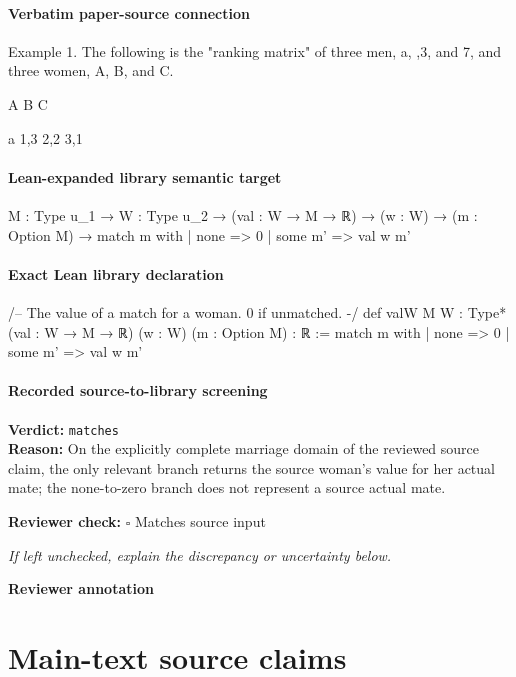 \documentclass[10pt]{article}
\newcommand{\reviewerbox}{%
  \par\noindent\fbox{\parbox{0.96\linewidth}{\rule{0pt}{0.38in}}}\par
}
\newcommand{\reviewmatch}[1]{%
  \par\noindent\textbf{Reviewer check:} $\square$\; #1\par
  \noindent\emph{If left unchecked, explain the discrepancy or uncertainty below.}\par
}
\begin{document}
\paragraph{Verbatim paper-source connection}
\begin{ReviewVerbatim}
Example 1. The following is the "ranking matrix" of three men, a, ,3, and 7,
and three women, A, B, and C.

                                        A        B       C

                              a 1,3 2,2 3,1
\end{ReviewVerbatim}

\paragraph{Lean-expanded library semantic target}
\begin{ReviewVerbatim}
{M : Type u_1} →
  {W : Type u_2} →
    (val : W → M → ℝ) →
      (w : W) →
        (m : Option M) →
          match m with
          | none => 0
          | some m' => val w m'
\end{ReviewVerbatim}

\paragraph{Exact Lean library declaration}
\begin{ReviewVerbatim}
/-- The value of a match for a woman. 0 if unmatched. -/
def valW {M W : Type*} (val : W → M → ℝ) (w : W) (m : Option M) : ℝ :=
  match m with
  | none => 0
  | some m' => val w m'
\end{ReviewVerbatim}

\paragraph{Recorded source-to-library screening}
\textbf{Verdict:} \texttt{matches}
\\
\textbf{Reason:} On the explicitly complete marriage domain of the reviewed source claim, the only relevant branch returns the source woman's value for her actual mate; the none-to-zero branch does not represent a source actual mate.
\reviewmatch{Matches source input}
\noindent\textbf{Reviewer annotation}\par
\reviewerbox

\clearpage
\hypertarget{source-claim-4b269aa42b6f656d}{}
\hypertarget{source-section-0c7af8265958a9ea}{}
\section*{Main-text source claims}
\end{document}
